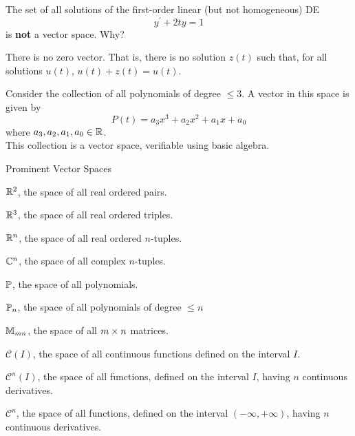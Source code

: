 \documentclass{beamer}
\begin{document}
\begin{frame}
\begin{example}
The set of all solutions of the first-order linear (but not homogeneous) DE
\begin{equation*}
y^\prime+2ty=1
\end{equation*}
is \textbf{not} a vector space. Why?\pause

\vspace{0.25cm}
There is no zero vector. That is, there is no solution $z(t)$ such that, for all solutions $u(t)$, $u(t)+z(t)=u(t)$.
\end{example}\pause

\begin{example}
Consider the collection of all polynomials of degree $\leq 3$. A vector in this space is given by
\begin{equation*}
P(t)=a_3x^3+a_2x^2+a_1x+a_0
\end{equation*}
where $a_3,a_2,a_1,a_0\in\mathbb{R}$.\\This collection is a vector space, verifiable using basic algebra.
\end{example}
\end{frame}

\begin{frame}
\begin{block}{Prominent Vector Spaces}
\begin{dynitemize}[<+- | alert@+>]
\item $\mathbb{R}^2$, the space of all real ordered pairs.
\item $\mathbb{R}^3$, the space of all real ordered triples.
\item $\mathbb{R}^n$, the space of all real ordered $n$-tuples.
\item $\mathbb{C}^n$, the space of all complex $n$-tuples.
\item $\mathbb{P}$, the space of all polynomials.
\item $\mathbb{P}_n$, the space of all polynomials of degree $\leq n$
\item $\mathbb{M}_{mn}$, the space of all $m \times n$ matrices.
\item $\mathcal{C}(I)$, the space of all continuous functions defined on the interval $I$.
\item $\mathcal{C}^n(I)$, the space of all functions, defined on the interval $I$, having $n$ continuous derivatives.
\item $\mathcal{C}^n$, the space of all functions, defined on the interval $(-\infty,+\infty)$, having $n$ continuous derivatives.
\end{dynitemize}
\end{block}
\end{frame}
\end{document}
